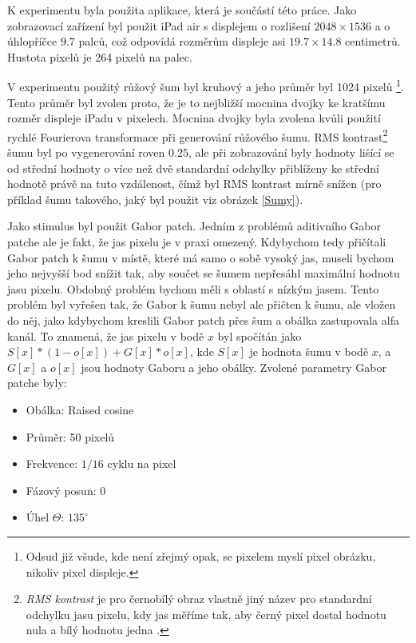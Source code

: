 K experimentu byla použita aplikace, která je součástí této práce. 
Jako zobrazovací zařízení byl použit iPad air s displejem o rozlišení
$2048\times1536$ a o úhlopříčce $9.7$ palců, což odpovídá rozměrům displeje asi
$19.7 \times 14.8$ centimetrů. Hustota pixelů je 264 pixelů na palec. 

V experimentu použitý růžový šum byl kruhový a jeho průměr byl 1024 pixelů
\footnote{Odsud již všude, kde není zřejmý opak, se pixelem myslí
pixel obrázku, nikoliv pixel displeje.}. Tento průměr byl zvolen proto, že je
to nejbližší mocnina dvojky ke kratšímu rozměr displeje iPadu v pixelech.
Mocnina dvojky byla zvolena kvůli použití rychlé Fourierova transformace při
generování růžového šumu. RMS kontrast\footnote{{\it RMS kontrast} je pro
černobílý obraz vlastně jiný název pro standardní odchylku jasu pixelu, kdy jas
měříme tak, aby černý pixel dostal hodnotu nula a bílý hodnotu jedna
\citep{RMS}.} šumu byl po vygenerování roven $0.25$, ale při zobrazování byly
hodnoty lišící se od střední hodnoty o více než dvě standardní odchylky
přiblíženy ke střední hodnotě právě na tuto vzdálenost, čímž byl RMS kontrast
mírně snížen (pro příklad šumu takového, jaký byl použit viz obrázek \ref{Sumy}). 

Jako stimulus byl použit Gabor patch. Jedním z problémů aditivního Gabor patche
ale je fakt, že jas pixelu je v praxi omezený. Kdybychom tedy přičítali Gabor
patch k šumu v místě, které má samo o sobě vysoký jas, museli bychom jeho nejvyšší
bod snížit tak, aby součet se šumem nepřesáhl maximální hodnotu jasu pixelu.
Obdobný problém bychom měli s oblastí s nízkým jasem. Tento problém byl vyřešen
tak, že Gabor k šumu nebyl ale přičten k šumu, ale vložen do něj, jako
kdybychom kreslili Gabor patch přes šum a obálka zastupovala alfa kanál. To
znamená, že jas pixelu v bodě $x$ byl spočítán jako $S[x] * (1-o[x]) +
G[x]*o[x]$, kde $S[x]$ je hodnota šumu v bodě $x$, a $G[x]$ a $o[x]$ jsou
hodnoty Gaboru a jeho obálky.  Zvolené parametry Gabor patche byly:

\begin{itemize}
\item Obálka: Raised cosine
\item Průměr: 50 pixelů
\item Frekvence: $1/16$ cyklu na pixel
\item Fázový posun: 0
\item Úhel $\Theta$: $135^\circ$ 
\end{itemize}

